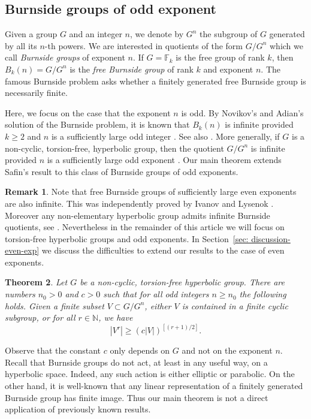 \documentclass[11pt]{article}
\theoremstyle{plain}
\newtheorem{thm}{Theorem}[section]
\theoremstyle{definition}
\newtheorem{rem}[thm]{Remark}
\begin{document}
\subsection{Burnside groups of odd exponent}
Given a group $G$ and an integer $n$, we denote by $G^n$ the subgroup of $G$ generated by all its $n$-th powers.
We are interested in quotients of the form $G/G^n$ which we call \emph{Burnside groups} of exponent $n$.
If $G = \mathbb F_k$ is the free group of rank $k$, then $B_k(n) = G/G^n$ is the \emph{free Burnside group} of rank $k$ and exponent $n$.
The famous Burnside problem asks whether a finitely generated free Burnside group is necessarily finite.

Here, we focus on the case that the exponent $n$ is odd.
By Novikov's and Adian's solution of the Burnside problem, it is known that $B_k(n)$ is infinite provided $k \geq 2$ and $n$ is a sufficiently large odd integer \cite{adian_burnside_1979}. See also \cite{olshanksii_novikov_1982,delzant_courbure_2008}.
More generally, if $G$ is a non-cyclic, torsion-free, hyperbolic group, then the quotient $G/G^n$ is infinite provided $n$ is a sufficiently large odd exponent \cite{olshanskii_periodic_1991,delzant_courbure_2008}.
Our main theorem extends Safin's result to this class of Burnside groups of odd exponents.

\begin{rem}
Note that free Burnside groups of sufficiently large even exponents are also infinite.
This was independently proved by Ivanov \cite{Ivanov:1994kh} and Lysenok \cite{Lysenok:1996kw}.
Moreover any non-elementary hyperbolic group admits infinite Burnside quotients, see \cite{Ivanov:1996va,coulon_infinite_2018}.
Nevertheless in the remainder of this article we will focus on torsion-free hyperbolic groups and odd exponents.
In Section~\ref{sec: discussion-even-exp} we discuss the difficulties to extend our results to the case of even exponents.
\end{rem}

\begin{thm}\label{T: intro - large powers free burnside}
Let $G$ be a non-cyclic, torsion-free hyperbolic group.
There are numbers $n_0>0$ and $c >0$ such that for all odd integers $n\geqslant n_0$ the following holds.
Given a finite subset $V \subset G/G^n$, either $V$ is contained in a finite cyclic subgroup, or for all $r\in \mathbb N$, we have
\[
|V^r|\geqslant \left( c |V| \right)^{[(r+1)/2]}.
\]
\end{thm}

Observe that the constant $c$ only depends on $G$ and not on the exponent $n$.
Recall that Burnside groups do not act, at least in any useful way, on a hyperbolic space.
Indeed, any such action is either elliptic or parabolic.
On the other hand, it is well-known that any linear representation of a finitely generated Burnside group has finite image.
Thus our main theorem is not a direct application of previously known results.
\end{document}
